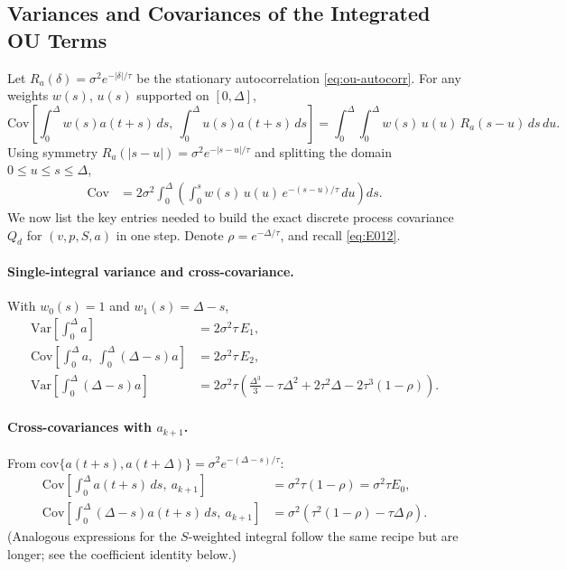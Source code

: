 \documentclass[10pt]{extarticle}
\begin{document}
\subsection{Variances and Covariances of the Integrated OU Terms}
Let $R_a(\delta)=\sigma^2 e^{-|\delta|/\tau}$ be the stationary autocorrelation \eqref{eq:ou-autocorr}.
For any weights $w(s)$, $u(s)$ supported on $[0,\Delta]$,
\begin{equation}
\mathrm{Cov}\!\left[\int_0^\Delta w(s) a(t+s)\,ds,\ \int_0^\Delta u(s) a(t+s)\,ds\right]
= \int_0^\Delta\!\!\int_0^\Delta w(s)\,u(u)\,R_a(s-u)\,ds\,du.
\label{eq:kernel-cov}
\end{equation}
Using symmetry $R_a(|s-u|)=\sigma^2 e^{-|s-u|/\tau}$ and splitting the domain $0\le u\le s\le \Delta$,
\begin{align}
\mathrm{Cov}
&= 2\sigma^2 \int_0^\Delta \left(\int_0^s w(s)\,u(u)\,e^{-(s-u)/\tau}\,du\right) ds.
\label{eq:kernel-cov-2}
\end{align}
We now list the key entries needed to build the exact discrete process covariance $Q_d$
for $(v,p,S,a)$ in one step. Denote $\rho=e^{-\Delta/\tau}$, and recall \eqref{eq:E012}.

\paragraph{Single-integral variance and cross-covariance.}
With $w_0(s)=1$ and $w_1(s)=\Delta-s$,
\begin{align}
\mathrm{Var}\!\left[\int_0^\Delta a\right]
&= 2\sigma^2 \tau\,E_1,
\label{eq:var-I0}
\\
\mathrm{Cov}\!\left[\int_0^\Delta a,\ \int_0^\Delta (\Delta-s)a\right]
&= 2\sigma^2 \tau\,E_2,
\label{eq:cov-I0-I1}
\\
\mathrm{Var}\!\left[\int_0^\Delta (\Delta-s)a\right]
&= 2\sigma^2 \tau\left(\frac{\Delta^3}{3} - \tau\Delta^2 + 2\tau^2\Delta - 2\tau^3(1-\rho)\right).
\label{eq:var-I1}
\end{align}

\paragraph{Cross-covariances with $a_{k+1}$.}
From $\mathrm{cov}\{a(t+s),a(t+\Delta)\}=\sigma^2 e^{-(\Delta-s)/\tau}$:
\begin{align}
\mathrm{Cov}\!\left[\int_0^\Delta a(t+s)\,ds,\ a_{k+1}\right]
&= \sigma^2 \tau (1-\rho)
= \sigma^2 \tau E_0,
\label{eq:cov-I0-ak1}
\\
\mathrm{Cov}\!\left[\int_0^\Delta (\Delta-s)a(t+s)\,ds,\ a_{k+1}\right]
&= \sigma^2\left(\tau^2(1-\rho) - \tau\Delta\,\rho\right).
\label{eq:cov-I1-ak1}
\end{align}
(Analogous expressions for the $S$-weighted integral follow the same recipe but are longer; see the coefficient identity below.)
\end{document}
